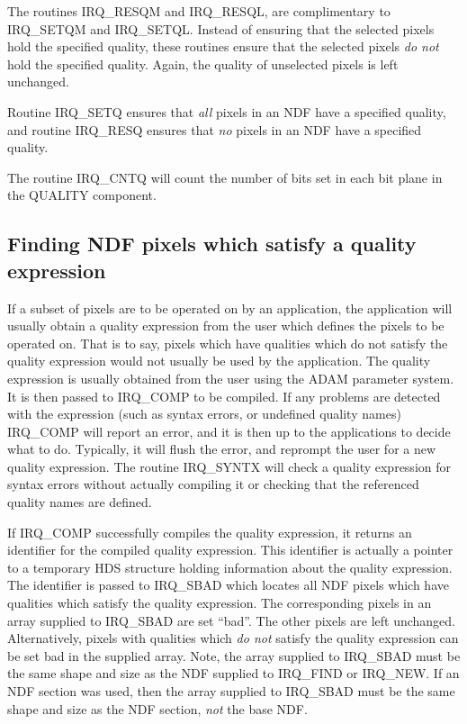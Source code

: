 The routines IRQ\_RESQM and IRQ\_RESQL, are complimentary to IRQ\_SETQM and
IRQ\_SETQL. Instead of ensuring that the selected pixels hold the specified
quality, these routines ensure that the selected pixels {\em do not} hold the
specified quality. Again, the quality of unselected pixels is left unchanged.

Routine IRQ\_SETQ ensures that {\em all} pixels in an NDF have a specified
quality, and routine IRQ\_RESQ ensures that {\em no} pixels in an NDF have a
specified quality.

The routine IRQ\_CNTQ will count the number of bits set in each bit plane in the
QUALITY component.

\subsection{Finding NDF pixels which satisfy a quality expression}
\label {SEC:QEXP}
If a subset of pixels are to be operated on by an application, the application
will usually obtain a quality expression from the user which defines the pixels
to be operated on. That is to say, pixels which have qualities which do not
satisfy the quality expression would not usually be used by the application. The
quality expression is usually obtained from the user using the ADAM parameter
system. It is then passed to IRQ\_COMP to be compiled. If any problems are
detected with the expression (such as syntax errors, or undefined quality names)
IRQ\_COMP will report an error, and it is then up to the applications to decide
what to do. Typically, it will flush the error, and reprompt the user for a new
quality expression. The routine IRQ\_SYNTX will check a quality expression for
syntax errors without actually compiling it or checking that the referenced
quality names are defined.

If IRQ\_COMP successfully compiles the quality expression, it returns an
identifier for the compiled quality expression. This identifier is actually a
pointer to a temporary HDS structure holding information about the quality
expression. The identifier is passed to IRQ\_SBAD which locates all NDF pixels
which have qualities which satisfy the quality expression. The corresponding
pixels in an array supplied to IRQ\_SBAD are set ``bad''. The other pixels are
left unchanged. Alternatively, pixels with qualities which {\em do not} satisfy
the quality expression can be set bad in the supplied array. Note, the array
supplied to IRQ\_SBAD must be the same shape and size as the NDF supplied to
IRQ\_FIND or IRQ\_NEW. If an NDF section was used, then the array supplied to
IRQ\_SBAD must be the same shape and size as the NDF section, {\em not} the base
NDF.


